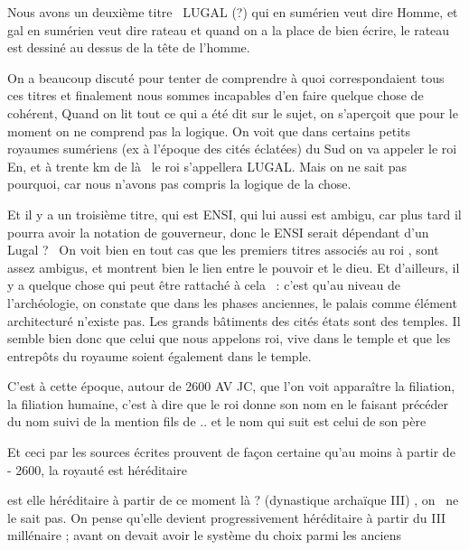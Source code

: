\documentclass[a4paper]{article}
\begin{document}
{
Nous avons un deuxième titre \ LUGAL (?) qui en sumérien veut dire
Homme, et gal en sumérien veut dire rateau et quand on a la place de
bien écrire, le rateau est dessiné au dessus de la tête de l'homme.}


\bigskip

{
On a beaucoup discuté pour tenter de comprendre à quoi correspondaient
tous ces titres et finalement nous sommes incapables d'en faire quelque
chose de cohérent, Quand on lit tout ce qui a été dit sur le sujet, on
s'aperçoit que pour le moment on ne comprend pas la logique. On voit
que dans certains petits royaumes sumériens (ex à l'époque des cités
éclatées) du Sud on va appeler le roi En, et à trente km de là \ le roi
s'appellera LUGAL. Mais on ne sait pas pourquoi, car nous n'avons pas
compris la logique de la chose.}


\bigskip

{
Et il y a un troisième titre, qui est ENSI, qui lui aussi est ambigu,
car plus tard il pourra avoir la notation de gouverneur, donc le ENSI
serait dépendant d'un Lugal ? \ On voit bien en tout cas que les
premiers titres associés au roi , sont assez ambigus, et montrent bien
le lien entre le pouvoir et le dieu. Et d'ailleurs, il y a quelque
chose qui peut être rattaché à cela \ : c'est qu'au niveau de
l'archéologie, on constate que dans les phases anciennes, le palais
comme élément architecturé n'existe pas. Les grands bâtiments des cités
états sont des temples. Il semble bien donc que celui que nous appelons
roi, vive dans le temple et que les entrepôts du royaume soient
également dans le temple.}


\bigskip

{
C'est à cette époque, autour de 2600 AV JC, que l'on voit apparaître la
filiation, la filiation humaine, c'est à dire que le roi donne son nom
en le faisant précéder du nom suivi de la mention {\textquotedbl} fils
de .. {\textquotedbl} et le nom qui suit est celui de son père}

{
Et ceci par les sources écrites prouvent de façon certaine qu'au moins à
partir de - 2600, la royauté est héréditaire}

{
est elle héréditaire à partir de ce moment là ? (dynastique archaïque
III) , on \ ne le sait pas. On pense qu'elle devient progressivement
héréditaire à partir du III millénaire ; avant on devait avoir le
système du choix parmi les anciens}
\end{document}
